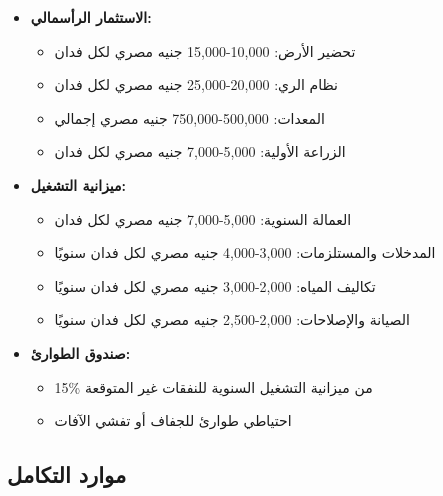 \begin{itemize}
    \item \textbf{الاستثمار الرأسمالي:}
    \begin{itemize}
        \item تحضير الأرض: 10,000-15,000 جنيه مصري لكل فدان
        \item نظام الري: 20,000-25,000 جنيه مصري لكل فدان
        \item المعدات: 500,000-750,000 جنيه مصري إجمالي
        \item الزراعة الأولية: 5,000-7,000 جنيه مصري لكل فدان
    \end{itemize}
    \item \textbf{ميزانية التشغيل:}
    \begin{itemize}
        \item العمالة السنوية: 5,000-7,000 جنيه مصري لكل فدان
        \item المدخلات والمستلزمات: 3,000-4,000 جنيه مصري لكل فدان سنويًا
        \item تكاليف المياه: 2,000-3,000 جنيه مصري لكل فدان سنويًا
        \item الصيانة والإصلاحات: 2,000-2,500 جنيه مصري لكل فدان سنويًا
    \end{itemize}
    \item \textbf{صندوق الطوارئ:}
    \begin{itemize}
        \item 15\% من ميزانية التشغيل السنوية للنفقات غير المتوقعة
        \item احتياطي طوارئ للجفاف أو تفشي الآفات
    \end{itemize}
\end{itemize}

\subsection{موارد التكامل}

